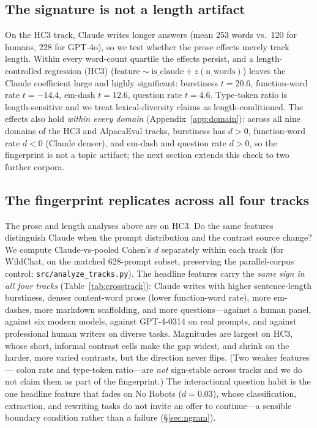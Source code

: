 \documentclass[11pt]{article}
\begin{document}
\subsection{The signature is not a length artifact}
\label{sec:length}
On the HC3 track, Claude writes longer answers (mean 253 words vs.\ 120 for
humans, 228 for GPT-4o), so we test whether the prose effects merely track
length. Within every word-count quartile the effects persist, and a
length-controlled regression (HC3)
($\text{feature}\sim\text{is\_claude}+z(\text{n\_words})$) leaves the Claude
coefficient large and highly significant: burstiness $t{=}20.6$, function-word
rate $t{=}{-}14.4$, em-dash $t{=}12.6$, question rate $t{=}4.6$. Type-token ratio
is length-sensitive and we treat lexical-diversity claims as length-conditioned.
The effects also hold \emph{within every domain} (Appendix~\ref{app:domain}):
across all nine domains of the HC3 and AlpacaEval tracks, burstiness has $d>0$,
function-word rate $d<0$ (Claude denser), and em-dash and question rate $d>0$, so
the fingerprint is not a topic artifact; the next section extends this check to two
further corpora.

\subsection{The fingerprint replicates across all four tracks}
\label{sec:crosstrack}
The prose and length analyses above are on HC3. Do the same features distinguish
Claude when the prompt distribution and the contrast source change? We compute
Claude-vs-pooled Cohen's $d$ separately within each track (for WildChat, on the
matched 628-prompt subset, preserving the parallel-corpus control;
\texttt{src/analyze\_tracks.py}). The headline features carry the \emph{same sign
in all four tracks} (Table~\ref{tab:crosstrack}): Claude writes with higher
sentence-length burstiness, denser content-word prose (lower function-word rate),
more em-dashes, more markdown scaffolding, and more questions---against a human
panel, against six modern models, against GPT-4-0314 on real prompts, and against
professional human writers on diverse tasks. Magnitudes are largest on HC3, whose
short, informal contrast cells make the gap widest, and shrink on the harder,
more varied contrasts, but the direction never flips. (Two weaker features---
colon rate and type-token ratio---are \emph{not} sign-stable across tracks and we
do not claim them as part of the fingerprint.) The interactional question habit is
the one headline feature that fades on No Robots ($d{=}0.03$), whose
classification, extraction, and rewriting tasks do not invite an offer to
continue---a sensible boundary condition rather than a failure
(\S\ref{sec:ngram}).
\end{document}
